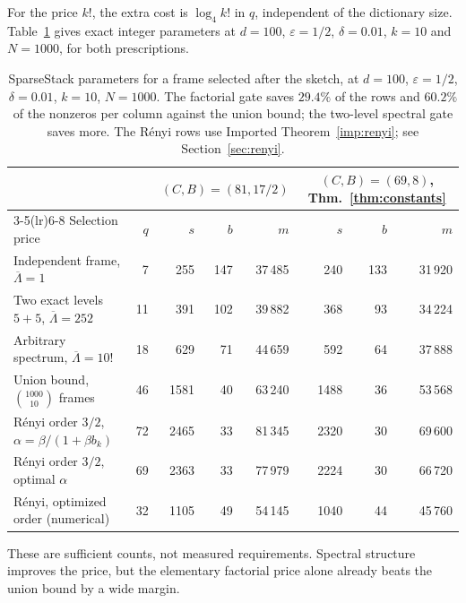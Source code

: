 \documentclass[11pt,a4paper]{article}
\theoremstyle{definition}
\theoremstyle{remark}
\newcommand{\eps}{\varepsilon}
\newcommand{\1}{\mathbf 1}
\newcommand{\Lbar}{\overline\Lambda}
\begin{document}
For the price $k!$, the extra cost is $\log_4k!$ in $q$, independent of
the dictionary size. Table~\ref{tab:gate} gives exact integer parameters
at $d=100$, $\eps=1/2$, $\delta=0.01$, $k=10$ and $N=1000$, for both
prescriptions.

\begin{table}[ht]
\centering\small
\begin{tabular}{l r rrr rrr}
\toprule
& & \multicolumn{3}{c}{$(C,B)=(81,17/2)$ \cite{SS}}
& \multicolumn{3}{c}{$(C,B)=(69,8)$, Thm.~\ref{thm:constants}}\\
\cmidrule(lr){3-5}\cmidrule(lr){6-8}
Selection price & $q$ & $s$ & $b$ & $m$ & $s$ & $b$ & $m$\\
\midrule
Independent frame, $\Lbar=1$ & 7 & 255 & 147 & 37\,485 & 240 & 133 & 31\,920\\
Two exact levels $5+5$, $\Lbar=252$ & 11 & 391 & 102 & 39\,882 & 368 & 93 & 34\,224\\
Arbitrary spectrum, $\Lbar=10!$ & 18 & 629 & 71 & 44\,659 & 592 & 64 & 37\,888\\
Union bound, $\binom{1000}{10}$ frames & 46 & 1581 & 40 & 63\,240 & 1488 & 36 & 53\,568\\
R\'enyi order $3/2$, $\alpha=\beta/(1+\beta b_k)$ & 72 & 2465 & 33 & 81\,345 & 2320 & 30 & 69\,600\\
R\'enyi order $3/2$, optimal $\alpha$ & 69 & 2363 & 33 & 77\,979 & 2224 & 30 & 66\,720\\
R\'enyi, optimized order (numerical) & 32 & 1105 & 49 & 54\,145 & 1040 & 44 & 45\,760\\
\bottomrule
\end{tabular}
\caption{SparseStack parameters for a frame selected after the sketch, at
$d=100$, $\eps=1/2$, $\delta=0.01$, $k=10$, $N=1000$. The factorial gate
saves $29.4\%$ of the rows and $60.2\%$ of the nonzeros per column
against the union bound; the two-level spectral gate saves more. The
R\'enyi rows use Imported Theorem~\ref{imp:renyi}; see
Section~\ref{sec:renyi}.}
\label{tab:gate}
\end{table}

These are sufficient counts, not measured requirements. Spectral
structure improves the price, but the elementary factorial price alone
already beats the union bound by a wide margin.
\end{document}
